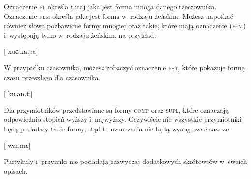 \begin{spacing}{1.1}
Oznaczenie \textsc{pl} określa tutaj jaka jest forma mnoga danego rzeczownika.
Oznaczenie \textsc{fem} określa jaka jest forma w~rodzaju żeńskim. Możesz
napotkać również słowa pozbawione formy mnogiej oraz takie, które mają
oznaczenie (\textsc{fem}) i~występują tylko w~rodzaju żeńskim, na przykład:

[ˈxuɛ.ka.pa]
\skipline

W przypadku czasownika, możesz zobaczyć oznaczenie \textsc{pst}, które pokazuje
formę czasu przeszłego dla czasownika.

[ˈku.an.ti]
\skipline

Dla przymiotników przedstawiane są formy \textsc{comp} oraz \textsc{supl}, które
oznaczają odpowiednio stopień wyższy i~najwyższy. Oczywiście nie wszystkie
przymiotniki będą posiadały takie formy, stąd te oznaczenia nie będą występować
zawsze.

[ˈwai.mɛ]
\skipline

Partykuły i~przyimki nie posiadają zazwyczaj dodatkowych skrótowców w~swoich
opisach.

\skipline

\end{spacing}